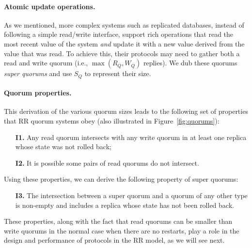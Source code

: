 \paragraph{Atomic update operations.}
As we mentioned, more complex systems such as replicated
databases, instead of following a simple read/write interface,
support rich operations that read the most recent value of the
system \emph{and} update it with a new value derived from the
value that was read. To achieve this, their protocols may need to
gather both a read and write quorum (i.e., $\max(R_Q, W_Q)$
replies). We dub these quorums \emph{super quorums} and use $S_Q$
to represent their size.

\paragraph{Quorum properties.} This derivation of the various quorum
sizes leads to the following set of properties that \ac{RR} quorum
systems obey (also illustrated in Figure~\ref{fig:quorums}):

\begin{enumerate}
    \item[\textbf{I1.}] Any read quorum intersects with any write
        quorum in at least one replica whose state was not rolled
        back;
    \item[\textbf{I2.}] It is possible some pairs of read quorums
        do not intersect.
\end{enumerate}

Using these properties, we can derive the following
property of super quorums:

\begin{enumerate}
    \item[\textbf{I3.}] The intersection between a super quorum
        and a quorum of any other type is non-empty and includes
        a replica whose state has not been rolled back.
\end{enumerate}

These properties, along with the fact that read quorums can be
smaller than write quorums in the normal case when there
are no restarts, play a role in the design and performance of
protocols in the \ac{RR} model, as we will see next.


